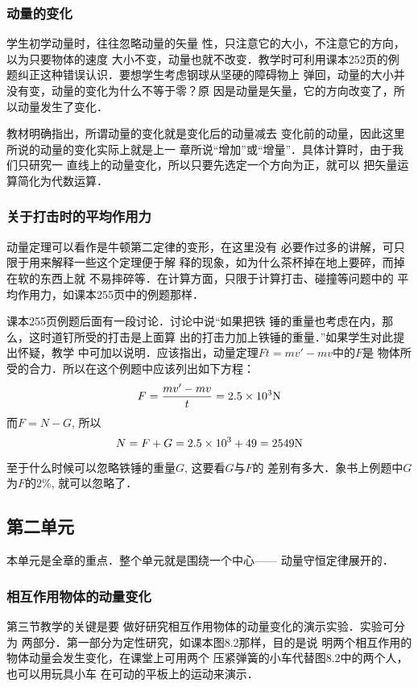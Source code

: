 \subsubsection{动量的变化}

学生初学动量时，往往忽略动量的矢量
性，只注意它的大小，不注意它的方向，以为只要物体的速度
大小不变，动量也就不改变．教学时可利用课本252页的例
题纠正这种错误认识．要想学生考虑钢球从坚硬的障碍物上
弹回，动量的大小并没有变，动量的变化为什么不等于零？原
因是动量是矢量，它的方向改变了，所以动量发生了变化．

教材明确指出，所谓动量的变化就是变化后的动量减去
变化前的动量，因此这里所说的动量的变化实际上就是上一
章所说“增加”或“增量”．具体计算时，由于我们只研究一
直线上的动量变化，所以只要先选定一个方向为正，就可以
把矢量运算简化为代数运算．

\subsubsection{关于打击时的平均作用力}
动量定理可以看作是牛顿第二定律的变形，在这里没有
必要作过多的讲解，可只限于用来解释一些这个定理便于解
释的现象，如为什么茶杯掉在地上要碎，而掉在软的东西上就
不易摔碎等．在计算方面，只限于计算打击、碰撞等问题中的
平均作用力，如课本255页中的例题那样．

课本255页例题后面有一段讨论．讨论中说“如果把铁
锤的重量也考虑在内，那么，这时道钉所受的打击是上面算
出的打击力加上铁锤的重量．”如果学生对此提出怀疑，教学
中可加以说明．应该指出，动量定理$Ft=mv'-mv$中的$F$是
物体所受的合力．所以在这个例题中应该列出如下方程：
\[F=\frac{mv'-mv}{t}=2.5\times10^3{\rm N}\]
而$F=N-G$, 所以
\[N=F+G=2.5\times10^3+49=2549{\rm N}\]

至于什么时候可以忽略铁锤的重量$G$, 这要看$G$与$F$的
差别有多大．象书上例题中$G$为$F$的2\%, 就可以忽略了．

\subsection{第二单元}
本单元是全章的重点．整个单元就是围绕一个中心——
动量守恒定律展开的．

\subsubsection{相互作用物体的动量变化}

第三节教学的关键是要
做好研究相互作用物体的动量变化的演示实验．实验可分为
两部分．第一部分为定性研究，如课本图8.2那样，目的是说
明两个相互作用的物体动量会发生变化，在课堂上可用两个
压紧弹簧的小车代替图8.2中的两个人，也可以用玩具小车
在可动的平板上的运动来演示．

